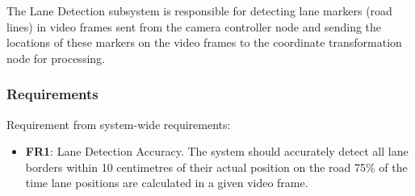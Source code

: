 \documentclass[titlepage,draft]{article}
\begin{document}
The Lane Detection subsystem is responsible for detecting lane markers (road lines) in video frames sent from the camera
controller node and sending the locations of these markers on the video frames to the coordinate transformation node for
processing.

\subsubsection{Requirements}

Requirement from system-wide requirements:

\begin{itemize}
	\item \textbf{FR1}: Lane Detection Accuracy. The system should accurately detect all lane borders within 10 centimetres
	      of their actual position on the road 75\% of the time lane positions are calculated in a given video frame.
\end{itemize}
\end{document}
